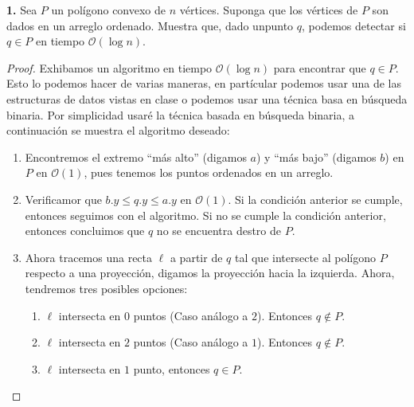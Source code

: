 \textbf{1.} Sea $P$ un polígono convexo de $n$ vértices.
Suponga que los vértices de $P$ son dados en un arreglo
ordenado. Muestra que, dado unpunto $q$, podemos detectar
si $q \in P$ en tiempo $\mathcal{O}(\log n)$.

\begin{proof}
  Exhibamos un algoritmo en tiempo $\mathcal{O}(\log n)$
  para encontrar que $q \in P$. Esto lo podemos hacer
  de varias maneras, en partícular podemos usar una de
  las estructuras de datos vistas en clase o podemos
  usar una técnica basa en búsqueda binaria. Por simplicidad
  usaré la técnica basada en búsqueda binaria, a continuación
  se muestra el algoritmo deseado:
  \begin{enumerate}
  \item Encontremos el extremo ``más alto'' (digamos $a$) y
    ``más bajo'' (digamos $b$) en $P$ en $\mathcal{O}(1)$,
    pues tenemos los puntos ordenados en un arreglo.
  \item Verificamor que $b.y \leq q.y \leq a.y$ en $\mathcal{O}(1)$.
    Si la condición anterior se cumple, entonces seguimos con
    el algoritmo. Si no se cumple la condición anterior, entonces
    concluimos que $q$ no se encuentra destro de $P$.
  \item Ahora tracemos una recta $\ell$ a partir de $q$ tal que intersecte al
    polígono $P$ respecto a una proyección, digamos la proyección hacia la izquierda.
    Ahora, tendremos tres posibles opciones:
    \begin{enumerate}
    \item $\ell$ intersecta en $0$ puntos (Caso análogo a $2$). Entonces $q \notin P$.
    \item $\ell$ intersecta en $2$ puntos (Caso análogo a $1$). Entonces $q \notin P$.
    \item $\ell$ intersecta en $1$ punto, entonces $q \in P$.
    \end{enumerate}
  \end{enumerate}
  \begin{figure}[ht!]
    \centering
\end{figure}
\end{proof}
